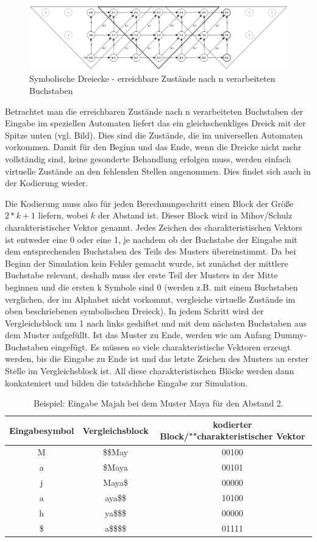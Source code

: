 \begin{figure}[!htbp]
\centering
\includegraphics[width=\linewidth,height=\textheight,keepaspectratio]{pic/dreiecke2}%
\caption{Symbolische Dreiecke - erreichbare Zustände nach n verarbeiteten Buchstaben}%
\end{figure}
Betrachtet man die erreichbaren Zustände nach n verarbeiteten Buchstaben der Eingabe im speziellen Automaten liefert das ein gleichschenkliges Dreick mit der Spitze unten (vgl. Bild). Dies sind die Zustände, die im universellen Automaten vorkommen. Damit für den Beginn und das Ende, wenn die Dreicke nicht mehr vollständig sind, keine gesonderte Behandlung erfolgen muss, werden einfach virtuelle Zustände an den fehlenden Stellen angenommen. Dies findet sich auch in der Kodierung wieder.

Die Kodierung muss also für jeden Berechnungsschritt einen Block der Größe $2*k+1$ liefern, wobei $k$ der Abstand ist. Dieser Block wird in Mihov/Schulz charakteristischer Vektor genannt. Jedes Zeichen des charakteristischen Vektors ist entweder eine 0 oder eine 1, je nachdem ob der Buchstabe der Eingabe mit dem entsprechenden Buchstaben des Teils des Musters übereinstimmt. Da bei Beginn der Simulation kein Fehler gemacht wurde, ist zunächst der mittlere Buchstabe relevant, deshalb muss der erste Teil der Musters in der Mitte beginnen und die ersten k Symbole sind 0 (werden z.B. mit einem Buchstaben verglichen, der im Alphabet nicht vorkommt, vergleiche virtuelle Zustände im oben beschriebenen symbolischen Dreieck). In jedem Schritt wird der Vergleichsblock um 1 nach links geshiftet und mit dem nächsten Buchstaben aus dem Muster aufgefüllt. Ist das Muster zu Ende, werden wie am Anfang Dummy-Buchstaben eingefügt. Es müssen so viele charakteristische Vektoren erzeugt werden, bis die Eingabe zu Ende ist und das letzte Zeichen des Musters an erster Stelle im Vergleichsblock ist. All diese charakteristischen Blöcke werden dann konkateniert und bilden die tatsächliche Eingabe zur Simulation.\\
\begin{table}[!htbp]
\begin{longtable}{c|c||c}
Eingabesymbol & Vergleichsblock & kodierter Block/""charakteristischer Vektor \\ \hline \endhead
M & \$\$May & 00100 \\
a & \$Maya & 00101 \\ 
j & Maya\$ & 00000 \\
a & aya\$\$ & 10100 \\
h & ya\$\$\$ & 00000 \\
\$ & a\$\$\$\$ & 01111 \\
\end{longtable}
\caption{Beispiel: Eingabe Majah bei dem Muster Maya für den Abstand 2.}
\end{table}

